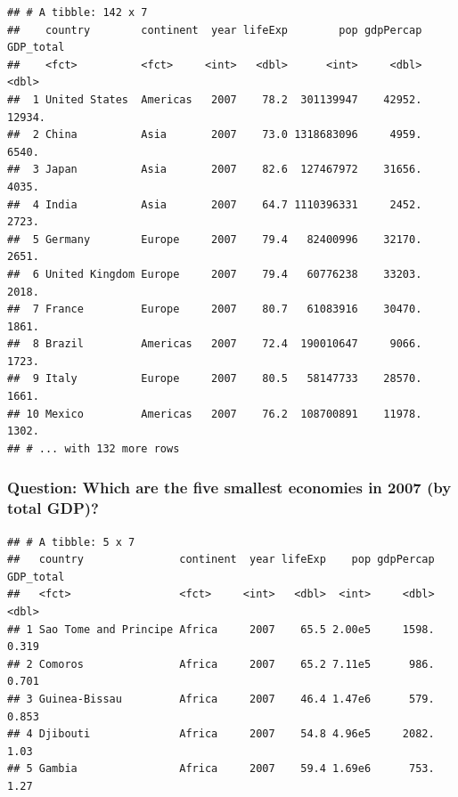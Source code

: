 \documentclass[11pt,]{article}
\newenvironment{Shaded}{\begin{snugshade}}{\end{snugshade}}
\newcommand{\KeywordTok}[1]{\textcolor[rgb]{0.13,0.29,0.53}{\textbf{#1}}}
\newcommand{\DecValTok}[1]{\textcolor[rgb]{0.00,0.00,0.81}{#1}}
\newcommand{\StringTok}[1]{\textcolor[rgb]{0.31,0.60,0.02}{#1}}
\newcommand{\OperatorTok}[1]{\textcolor[rgb]{0.81,0.36,0.00}{\textbf{#1}}}
\newcommand{\NormalTok}[1]{#1}
\begin{document}
\begin{verbatim}
## # A tibble: 142 x 7
##    country        continent  year lifeExp        pop gdpPercap GDP_total
##    <fct>          <fct>     <int>   <dbl>      <int>     <dbl>     <dbl>
##  1 United States  Americas   2007    78.2  301139947    42952.    12934.
##  2 China          Asia       2007    73.0 1318683096     4959.     6540.
##  3 Japan          Asia       2007    82.6  127467972    31656.     4035.
##  4 India          Asia       2007    64.7 1110396331     2452.     2723.
##  5 Germany        Europe     2007    79.4   82400996    32170.     2651.
##  6 United Kingdom Europe     2007    79.4   60776238    33203.     2018.
##  7 France         Europe     2007    80.7   61083916    30470.     1861.
##  8 Brazil         Americas   2007    72.4  190010647     9066.     1723.
##  9 Italy          Europe     2007    80.5   58147733    28570.     1661.
## 10 Mexico         Americas   2007    76.2  108700891    11978.     1302.
## # ... with 132 more rows
\end{verbatim}

\subsubsection{Question: Which are the five smallest economies in 2007
(by total
GDP)?}\label{question-which-are-the-five-smallest-economies-in-2007-by-total-gdp}

\begin{Shaded}
\end{Shaded}

\begin{verbatim}
## # A tibble: 5 x 7
##   country               continent  year lifeExp    pop gdpPercap GDP_total
##   <fct>                 <fct>     <int>   <dbl>  <int>     <dbl>     <dbl>
## 1 Sao Tome and Principe Africa     2007    65.5 2.00e5     1598.     0.319
## 2 Comoros               Africa     2007    65.2 7.11e5      986.     0.701
## 3 Guinea-Bissau         Africa     2007    46.4 1.47e6      579.     0.853
## 4 Djibouti              Africa     2007    54.8 4.96e5     2082.     1.03 
## 5 Gambia                Africa     2007    59.4 1.69e6      753.     1.27
\end{verbatim}
\end{document}
